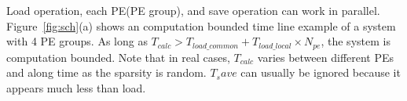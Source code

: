 Load operation, each PE(PE group), and save operation can work in parallel. Figure~\ref{fig:sch}(a) shows an computation bounded time line example of a system with 4 PE groups. As long as $T_{calc}>T_{load\_common} + T_{load\_local}\times N_{pe}$, the system is computation bounded. Note that in real cases, $T_{calc}$ varies between different PEs and along time as the sparsity is random. $T_save$ can usually be ignored because it appears much less than load.   

